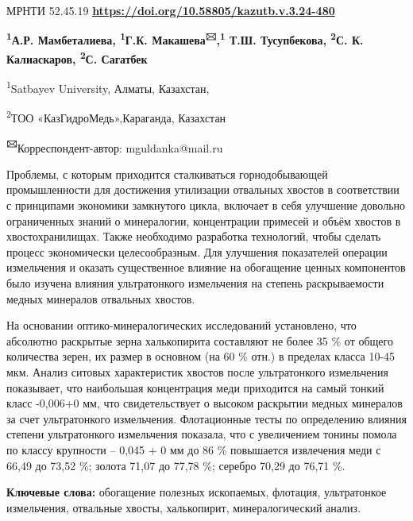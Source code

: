 \newpage
МРНТИ 52.45.19
\hfill {\bfseries \href{https://doi.org/10.58805/kazutb.v.3.24-480}{https://doi.org/10.58805/kazutb.v.3.24-480}}


\begin{center}
{\bfseries \textsuperscript{1}А.Р. Мамбеталиева, \textsuperscript{1}Г.К. Макашева\textsuperscript{🖂},\textsuperscript{1} Т.Ш. Тусупбекова, \textsuperscript{2}С. К. Калиаскаров, \textsuperscript{2}С. Сагатбек}

\textsuperscript{1}Satbayev University, Алматы, Казахстан,

\textsuperscript{2}ТОО «КазГидроМедь»,Караганда, Казахстан

{\bfseries \textsuperscript{🖂}}Корреспондент-автор: mguldanka@mail.ru
\end{center}

Проблемы, с которым приходится сталкиваться горнодобывающей
промышленности для достижения утилизации отвальных хвостов в
соответствии с принципами экономики замкнутого цикла, включает в себя
улучшение довольно ограниченных знаний о минералогии, концентрации
примесей и объём хвостов в хвостохранилищах. Также необходимо разработка
технологий, чтобы сделать процесс экономически целесообразным. Для
улучшения показателей операции измельчения и оказать существенное
влияние на обогащение ценных компонентов было изучена влияния
ультратонкого измельчения на степень раскрываемости медных минералов
отвальных хвостов.

На основании оптико-минералогических исследований установлено, что
абсолютно раскрытые зерна халькопирита составляют не более 35 \% от
общего количества зерен, их размер в основном (на 60 \% отн.) в пределах
класса 10-45 мкм. Анализ ситовых характеристик хвостов после
ультратонкого измельчения показывает, что наибольшая концентрация меди
приходится на самый тонкий класс -0,006+0 мм, что свидетельствует о
высоком раскрытии медных минералов за счет ультратонкого измельчения.
Флотационные тесты по определению влияния степени ультратонкого
измельчения показала, что с увеличением тонины помола по классу
крупности -- 0,045 + 0 мм до 86 \% повышается извлечения меди с 66,49 до
73,52 \%; золота 71,07 до 77,78 \%; серебро 70,29 до 76,71 \%.

{\bfseries Ключевые слова:} обогащение полезных ископаемых, флотация,
ультратонкое измельчения, отвальные хвосты, халькопирит,
минералогический анализ.

